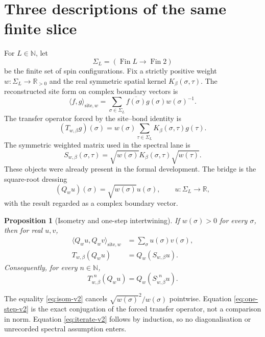 \documentclass[11pt]{article}
\newtheorem{proposition}[theorem]{Proposition}
\newcommand{\R}{\mathbb R}
\newcommand{\N}{\mathbb N}
\newcommand{\SigmaL}{\Sigma_L}
\begin{document}
\section{Three descriptions of the same finite slice}

For $L\in\N$, let
\[
  \SigmaL=(\operatorname{Fin} L\to\operatorname{Fin}2)
\]
be the finite set of spin configurations.  Fix a strictly positive weight
$w:\SigmaL\to\R_{>0}$ and the real symmetric spatial kernel
$K_\beta(\sigma,\tau)$.  The reconstructed site form on complex boundary
vectors is
\begin{equation}\label{eq:site-form-v2}
  \langle f,g\rangle_{\mathrm{site},w}
  =\sum_{\sigma\in\SigmaL}
    \overline{f(\sigma)}g(\sigma)w(\sigma)^{-1}.
\end{equation}
The transfer operator forced by the site--bond identity is
\begin{equation}\label{eq:forced-v2}
  (T_{w,\beta}g)(\sigma)
  =w(\sigma)\sum_{\tau\in\SigmaL}K_\beta(\sigma,\tau)g(\tau).
\end{equation}
The symmetric weighted matrix used in the spectral lane is
\begin{equation}\label{eq:sym-v2}
  S_{w,\beta}(\sigma,\tau)
  =\sqrt{w(\sigma)}K_\beta(\sigma,\tau)\sqrt{w(\tau)}.
\end{equation}
These objects were already present in the formal development.  The bridge is
the square-root dressing
\begin{equation}\label{eq:q-v2}
  (Q_wu)(\sigma)=\sqrt{w(\sigma)}u(\sigma),
  \qquad u:\SigmaL\to\R,
\end{equation}
with the result regarded as a complex boundary vector.

\begin{proposition}[Isometry and one-step intertwining]\label{prop:intertwine}
If $w(\sigma)>0$ for every $\sigma$, then for real $u,v$,
\begin{align}
 \langle Q_wu,Q_wv\rangle_{\mathrm{site},w}
   &=\sum_\sigma u(\sigma)v(\sigma),\label{eq:isom-v2}\\
 T_{w,\beta}(Q_wu)&=Q_w(S_{w,\beta}u).\label{eq:one-step-v2}
\end{align}
Consequently, for every $n\in\N$,
\begin{equation}\label{eq:iterate-v2}
  T_{w,\beta}^{,n}(Q_wu)=Q_w(S_{w,\beta}^{,n}u).
\end{equation}
\end{proposition}

The equality \eqref{eq:isom-v2} cancels
$\sqrt{w(\sigma)}^2/w(\sigma)$ pointwise.  Equation
\eqref{eq:one-step-v2} is the exact conjugation of the forced transfer
operator, not a comparison in norm.  Equation \eqref{eq:iterate-v2} follows by
induction, so no diagonalisation or unrecorded spectral assumption enters.
\end{document}
